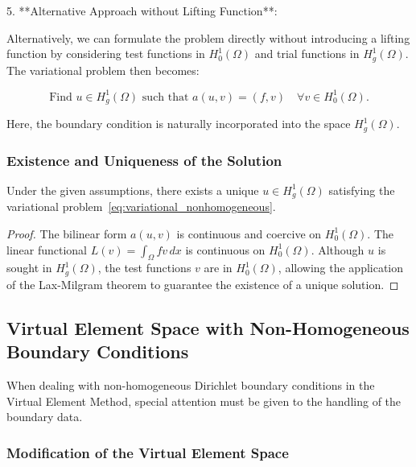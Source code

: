 \documentclass[class=article, crop=false]{standalone}
\begin{document}
5. **Alternative Approach without Lifting Function**:

   Alternatively, we can formulate the problem directly without introducing a lifting function by considering test functions in $H_0^1(\Omega)$ and trial functions in $H_g^1(\Omega)$. The variational problem then becomes:

   \begin{equation}
   \text{Find } u \in H_g^1(\Omega) \text{ such that } a(u, v) = (f, v) \quad \forall v \in H_0^1(\Omega). \label{eq:variational_nonhomogeneous}
   \end{equation}

   Here, the boundary condition is naturally incorporated into the space $H_g^1(\Omega)$.

\subsubsection{Existence and Uniqueness of the Solution}

\begin{theorem}
Under the given assumptions, there exists a unique $u \in H_g^1(\Omega)$ satisfying the variational problem~\eqref{eq:variational_nonhomogeneous}.
\end{theorem}

\begin{proof}
The bilinear form $a(u, v)$ is continuous and coercive on $H_0^1(\Omega)$. The linear functional $L(v) = \int_\Omega f v \, dx$ is continuous on $H_0^1(\Omega)$. Although $u$ is sought in $H_g^1(\Omega)$, the test functions $v$ are in $H_0^1(\Omega)$, allowing the application of the Lax-Milgram theorem to guarantee the existence of a unique solution.
\end{proof}

\subsection{Virtual Element Space with Non-Homogeneous Boundary Conditions}

When dealing with non-homogeneous Dirichlet boundary conditions in the Virtual Element Method, special attention must be given to the handling of the boundary data.

\subsubsection{Modification of the Virtual Element Space}
\end{document}
